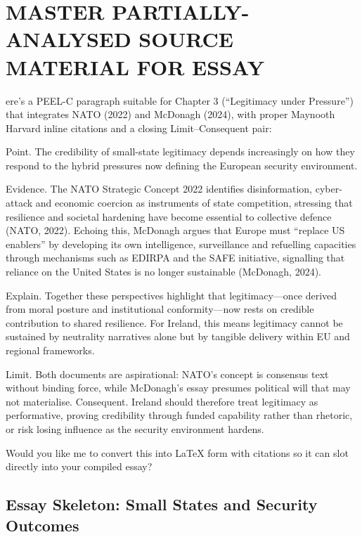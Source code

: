 \chapter{MASTER PARTIALLY-ANALYSED SOURCE MATERIAL FOR ESSAY}


ere’s a PEEL-C paragraph suitable for Chapter 3 (“Legitimacy under Pressure”) that integrates NATO (2022) and McDonagh (2024), with proper Maynooth Harvard inline citations and a closing Limit–Consequent pair:

Point. The credibility of small-state legitimacy depends increasingly on how they respond to the hybrid pressures now defining the European security environment.

Evidence. The NATO Strategic Concept 2022 identifies disinformation, cyber-attack and economic coercion as instruments of state competition, stressing that resilience and societal hardening have become essential to collective defence (NATO, 2022). Echoing this, McDonagh argues that Europe must “replace US enablers” by developing its own intelligence, surveillance and refuelling capacities through mechanisms such as EDIRPA and the SAFE initiative, signalling that reliance on the United States is no longer sustainable (McDonagh, 2024).

Explain. Together these perspectives highlight that legitimacy—once derived from moral posture and institutional conformity—now rests on credible contribution to shared resilience. For Ireland, this means legitimacy cannot be sustained by neutrality narratives alone but by tangible delivery within EU and regional frameworks.

Limit. Both documents are aspirational: NATO’s concept is consensus text without binding force, while McDonagh’s essay presumes political will that may not materialise.
Consequent. Ireland should therefore treat legitimacy as performative, proving credibility through funded capability rather than rhetoric, or risk losing influence as the security environment hardens.

Would you like me to convert this into LaTeX form with \parencite{} citations so it can slot directly into your compiled essay?
\section*{Essay Skeleton: Small States and Security Outcomes}

